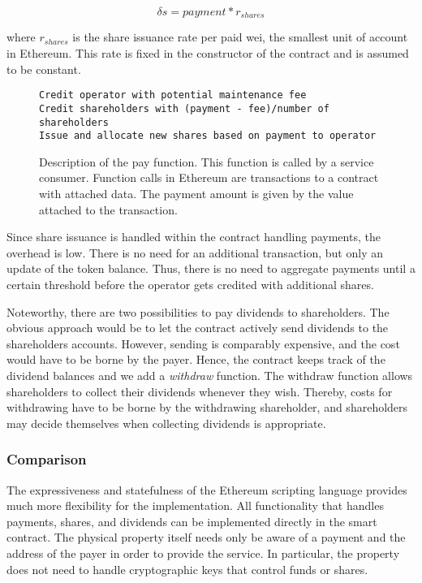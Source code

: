 \begin{equation*}
\delta s = payment * r_{shares} 
\end{equation*}

where $r_{shares}$ is the share issuance rate per paid wei, the smallest unit of account in Ethereum. This rate is fixed in the constructor of the contract and is assumed to be constant.

\begin{figure}
\label{lst:payfunction}
\begin{lstlisting}[breaklines]
Credit operator with potential maintenance fee
Credit shareholders with (payment - fee)/number of shareholders
Issue and allocate new shares based on payment to operator
\end{lstlisting}
\caption{Description of the pay function. This function is called by a service consumer. Function calls in Ethereum are transactions to a contract with attached data. The payment amount is given by the value attached to the transaction.}
\end{figure}

Since share issuance is handled within the contract handling payments, the overhead is low. There is no need for an additional transaction, but only an update of the token balance. Thus, there is no need to aggregate payments until a certain threshold before the operator gets credited with additional shares. 

Noteworthy, there are two possibilities to pay dividends to shareholders. The obvious approach would be to let the contract actively send dividends to the shareholders accounts. However, sending is comparably expensive, and the cost would have to be borne by the payer. Hence, the contract keeps track of the dividend balances and we add a \emph{withdraw} function. The withdraw function allows shareholders to collect their dividends whenever they wish. Thereby, costs for withdrawing have to be borne by the withdrawing shareholder, and shareholders may decide themselves when collecting dividends is appropriate. 

\subsubsection{Comparison}

The expressiveness and statefulness of the Ethereum scripting language provides much more flexibility for the implementation. All functionality that handles payments, shares, and dividends can be implemented directly in the smart contract. The physical property itself needs  only be aware of a payment and the address of the payer in order to provide the service. In particular, the property does not need to handle cryptographic keys that control funds or shares.


